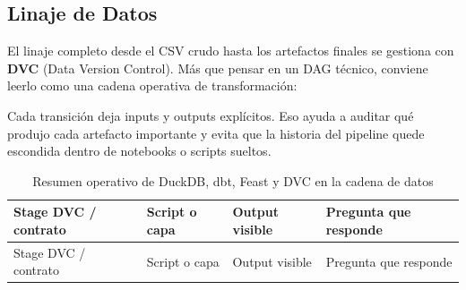 \documentclass[
  spanish,
  11pt,
  letterpaper,
]{scrbook}
\theoremstyle{plain}
\theoremstyle{remark}
\begin{document}
\subsection{Linaje de Datos}\label{linaje-de-datos}

El linaje completo desde el CSV crudo hasta los artefactos finales se
gestiona con \textbf{DVC} (Data Version Control). Más que pensar en un
DAG técnico, conviene leerlo como una cadena operativa de
transformación:

Cada transición deja inputs y outputs explícitos. Eso ayuda a auditar
qué produjo cada artefacto importante y evita que la historia del
pipeline quede escondida dentro de notebooks o scripts sueltos.

\begin{longtable}[]{@{}
  >{\raggedright\arraybackslash}p{}
  >{\raggedright\arraybackslash}p{}
  >{\raggedright\arraybackslash}p{}
  >{\raggedright\arraybackslash}p{}@{}}
\caption{Resumen operativo de DuckDB, dbt, Feast y DVC en la cadena de
datos}\label{tbl-platform-stages}\tabularnewline
\toprule\noalign{}
\begin{minipage}[b]{\linewidth}\raggedright
Stage DVC / contrato
\end{minipage} & \begin{minipage}[b]{\linewidth}\raggedright
Script o capa
\end{minipage} & \begin{minipage}[b]{\linewidth}\raggedright
Output visible
\end{minipage} & \begin{minipage}[b]{\linewidth}\raggedright
Pregunta que responde
\end{minipage} \\
\midrule\noalign{}
\endfirsthead
\toprule\noalign{}
\begin{minipage}[b]{\linewidth}\raggedright
Stage DVC / contrato
\end{minipage} & \begin{minipage}[b]{\linewidth}\raggedright
Script o capa
\end{minipage} & \begin{minipage}[b]{\linewidth}\raggedright
Output visible
\end{minipage} & \begin{minipage}[b]{\linewidth}\raggedright
Pregunta que responde
\end{minipage} \\

\end{longtable}
\end{document}
